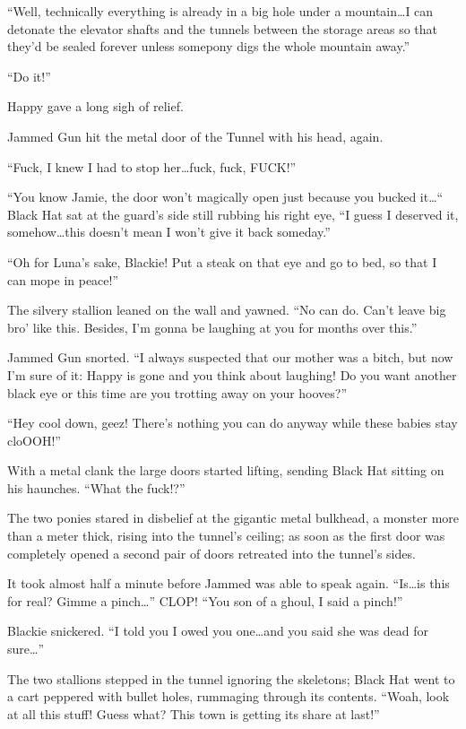 ``Well, technically everything is already in a big hole under a mountain\dots I can detonate the elevator shafts and the tunnels between the storage areas so that they'd be sealed forever unless somepony digs the whole mountain away.''

``Do it!''

Happy gave a long sigh of relief.

\horizonline


Jammed Gun hit the metal door of the Tunnel with his head, again.

``Fuck, I knew I had to stop her\dots fuck, fuck, FUCK!''

``You know Jamie, the door won't magically open just because you bucked it\dots`` Black Hat sat at the guard's side still rubbing his right eye, ``I guess I deserved it, somehow\dots this doesn't mean I won't give it back someday.''

``Oh for Luna's sake, Blackie! Put a steak on that eye and go to bed, so that I can mope in peace!''

The silvery stallion leaned on the wall and yawned. ``No can do. Can't leave big bro' like this. Besides, I'm gonna be laughing at you for months over this.''

Jammed Gun snorted. ``I always suspected that our mother was a bitch, but now I'm sure of it: Happy is gone and you think about laughing! Do you want another black eye or this time are you trotting away on your hooves?''

``Hey cool down, geez! There's nothing you can do anyway while these babies stay cloOOH!''

With a metal clank the large doors started lifting, sending Black Hat sitting on his haunches. ``What the fuck!?''

The two ponies stared in disbelief at the gigantic metal bulkhead, a monster more than a meter thick, rising into the tunnel's ceiling; as soon as the first door was completely opened a second pair of doors retreated into the tunnel's sides.

It took almost half a minute before Jammed was able to speak again. ``Is\dots is this for real? Gimme a pinch\dots'' CLOP! ``You son of a ghoul, I said a pinch!''

Blackie snickered. ``I told you I owed you one\dots and you said she was dead for sure\dots''

The two stallions stepped in the tunnel ignoring the skeletons; Black Hat went to a cart peppered with bullet holes, rummaging through its contents. ``Woah, look at all this stuff! Guess what? This town is getting its share at last!''

